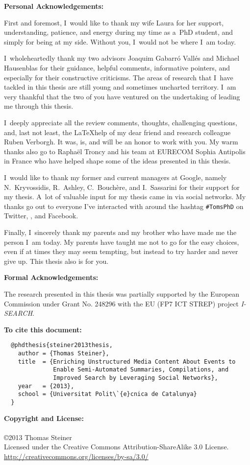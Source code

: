 \begin{acknowledgements}

\textbf{Personal Acknowledgements:}

First and foremost, I~would like to thank my wife Laura
for her support, understanding, patience, and energy
during my time as a~PhD student, and simply for being at my side.
Without you, I~would not be where I~am today.

I~wholeheartedly thank my two advisors Joaquim Gabarró Vallés
and Michael Hausenblas for their guidance, helpful comments,
informative pointers, and especially
for their constructive criticisms.
The areas of research that I~have tackled in this thesis
are still young and sometimes uncharted territory.
I~am very thankful that the two of you have ventured
on the undertaking of leading me through this thesis.

I~deeply appreciate all the review comments, thoughts, challenging questions,
and, last not least, the \LaTeX help of my dear friend
and research colleague Ruben Verborgh.
It was, is, and will be an honor to work with you.
My warm thanks also go to Raphaël Troncy and his team
at \mbox{EURECOM} Sophia Antipolis in France
who have helped shape some of the ideas presented in this thesis.

I~would like to thank my former and current managers at Google,
namely N.~Kryvossidis, R.~Ashley, C.~Bouchère, and I.~Sassarini
for their support for my thesis.
A~lot of valuable input for my thesis came in via social networks.
My thanks go out to everyone I've interacted with
around the hashtag \texttt{\#TomsPhD}
on Twitter, \googleplus, and Facebook.

Finally, I~sincerely thank my parents and my brother
who have made me the person I~am today.
My parents have taught me
not to go for the easy choices, even
if at times they may seem tempting,
but instead to try harder and never give up.
This thesis also is for you.

\textbf{Formal Acknowledgements:}

The research presented in this thesis
was partially supported by the European Commission
under Grant No. 248296 with the EU (FP7 ICT STREP)
project \mbox{\emph{I-SEARCH}}.

\vspace{80mm}

\textbf{To cite this document:}

\small
\begin{verbatim}
  @phdthesis{steiner2013thesis,
    author = {Thomas Steiner},
    title  = {Enriching Unstructured Media Content About Events to
              Enable Semi-Automated Summaries, Compilations, and
              Improved Search by Leveraging Social Networks},
    year   = {2013},
    school = {Universitat Polit\`{e}cnica de Catalunya}
  }
\end{verbatim}

\normalsize

\vspace{10mm}
\textbf{Copyright and License:}\\\\
\small \copyright \normalsize 2013 Thomas Steiner\\
Licensed under the Creative Commons Attribution-ShareAlike 3.0 License.\\
\url{http://creativecommons.org/licenses/by-sa/3.0/}

\end{acknowledgements}
